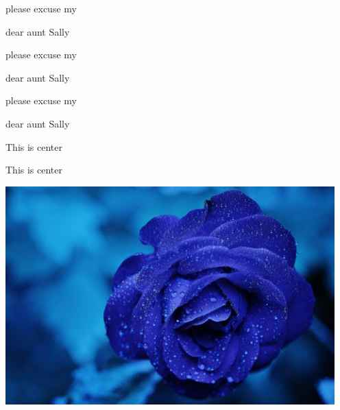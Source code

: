 \documentclass[11pt]{article}
\begin{document}
please excuse my \begin{Large}
  dear aunt Sally
\end{Large}

please excuse my \begin{huge}
  dear aunt Sally
\end{huge}

please excuse my \begin{Huge}
  dear aunt Sally
\end{Huge}

\begin{center}
  This is center
\end{center}

\begin{flushleft}
  This is center
\end{flushleft}

\includegraphics[width=5in]{rose.jpeg}
\end{document}
